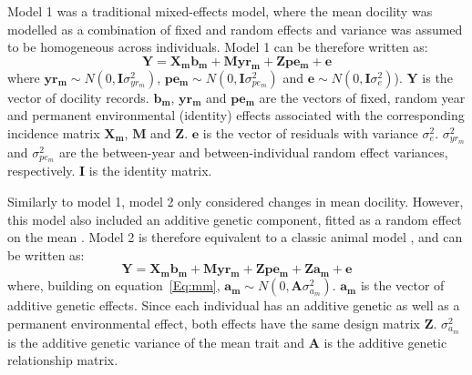 \documentclass[a4paper,12pt,twoside]{article}
\begin{document}
	Model 1 was a traditional mixed-effects model, where the mean docility was modelled as a combination of fixed and random effects and variance was assumed to be homogeneous across individuals. 
	Model 1 can be therefore written as:
	\begin{equation}\label{Eq:mm}
	\boldsymbol{Y} = \boldsymbol{X_m b_m} + \boldsymbol{M yr_m} + \boldsymbol{Z pe_m} + \boldsymbol{e}
	\end{equation}
	where $\boldsymbol{yr_m} \sim N(0, \boldsymbol{I}\sigma_{yr_m}^2)$, $\boldsymbol{pe_m} \sim N(0, \boldsymbol{I}\sigma_{pe_m}^2)$ and $\boldsymbol{e} \sim N(0, \boldsymbol{I}\sigma_e^2)$).
	$\boldsymbol{Y}$ is the vector of docility records. 
	$\boldsymbol{b_m}$, $\boldsymbol{yr_m}$ and $\boldsymbol{pe_m}$ are the vectors of fixed, random year and permanent environmental (identity) effects associated with the corresponding incidence matrix $\boldsymbol{X_m}$, $\boldsymbol{M}$ and $\boldsymbol{Z}$. 
	$\boldsymbol{e}$ is the vector of residuals with variance $\sigma_e^2$. 
	$\sigma_{yr_m}^2$ and $\sigma_{pe_m}^2$ are the between-year and between-individual random effect variances, respectively. 
	$\boldsymbol{I}$ is the identity matrix. 
	
	Similarly to model 1, model 2 only considered changes in mean docility. 
	However, this model also included an additive genetic component, fitted as a random effect on the mean \citep{waldmann_easy_2009}.
	Model 2 is therefore equivalent to a classic animal model \citep{kruuk_estimating_2004}, and can be written as:
	\begin{equation}\label{Eq:am}
	\boldsymbol{Y} = \boldsymbol{X_m b_m} + \boldsymbol{M yr_m} + \boldsymbol{Z pe_m} + \boldsymbol{Z a_m} + \boldsymbol{e}
	\end{equation}
	where, building on equation~\ref{Eq:mm}, $\boldsymbol{a_m} \sim N(0, \boldsymbol{A}\sigma_{a_{m}}^2)$.
	$\boldsymbol{a_m}$ is the vector of additive genetic effects. 
	Since each individual has an additive genetic as well as a permanent environmental effect, both effects have the same design matrix $\boldsymbol{Z}$.
	$\sigma_{a_{m}}^2$ is the additive genetic variance of the mean trait and $\boldsymbol{A}$ is the additive genetic relationship matrix.
	
\end{document}
